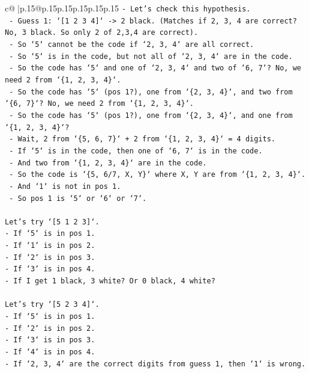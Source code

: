\documentclass{article}
\begin{document}
{\begin{supertabular}{c@{$\;$}|p{.15\linewidth}@{}p{.15\linewidth}p{.15\linewidth}p{.15\linewidth}p{.15\linewidth}p{.15\linewidth}}
{{{\texttt{{-} Let's check this hypothesis.} \\
\texttt{    {-} Guess 1: `{[}1 2 3 4{]}` {-}> 2 black. (Matches if 2, 3, 4 are correct? No, 3 black. So only 2 of 2,3,4 are correct).} \\
\texttt{    {-} So `5` cannot be the code if `2, 3, 4` are all correct.} \\
\texttt{    {-} So `5` is in the code, but not all of `2, 3, 4` are in the code.} \\
\texttt{    {-} So the code has `5` and one of `2, 3, 4` and two of `6, 7`? No, we need 2 from `\{1, 2, 3, 4\}`.} \\
\texttt{    {-} So the code has `5` (pos 1?), one from `\{2, 3, 4\}`, and two from `\{6, 7\}`? No, we need 2 from `\{1, 2, 3, 4\}`.} \\
\texttt{    {-} So the code has `5` (pos 1?), one from `\{2, 3, 4\}`, and one from `\{1, 2, 3, 4\}`?} \\
\texttt{    {-} Wait, 2 from `\{5, 6, 7\}` + 2 from `\{1, 2, 3, 4\}` = 4 digits.} \\
\texttt{    {-} If `5` is in the code, then one of `6, 7` is in the code.} \\
\texttt{    {-} And two from `\{1, 2, 3, 4\}` are in the code.} \\
\texttt{    {-} So the code is `\{5, 6/7, X, Y\}` where X, Y are from `\{1, 2, 3, 4\}`.} \\
\texttt{    {-} And `1` is not in pos 1.} \\
\texttt{    {-} So pos 1 is `5` or `6` or `7`.} \\
\\ 
\texttt{Let's try `{[}5 1 2 3{]}`.} \\
\texttt{{-} If `5` is in pos 1.} \\
\texttt{{-} If `1` is in pos 2.} \\
\texttt{{-} If `2` is in pos 3.} \\
\texttt{{-} If `3` is in pos 4.} \\
\texttt{{-} If I get 1 black, 3 white? Or 0 black, 4 white?} \\
\\ 
\texttt{Let's try `{[}5 2 3 4{]}`.} \\
\texttt{{-} If `5` is in pos 1.} \\
\texttt{{-} If `2` is in pos 2.} \\
\texttt{{-} If `3` is in pos 3.} \\
\texttt{{-} If `4` is in pos 4.} \\
\texttt{{-} If `2, 3, 4` are the correct digits from guess 1, then `1` is wrong.} \\
}}}
\end{supertabular}}
\end{document}
